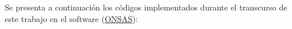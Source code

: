 \chapter{}\label{Ape1}

Se presenta a continuación los códigos implementados durante el transcurso de este trabajo en el software (\href{https://github.com/ONSAS/ONSAS/}{ONSAS}):


%
